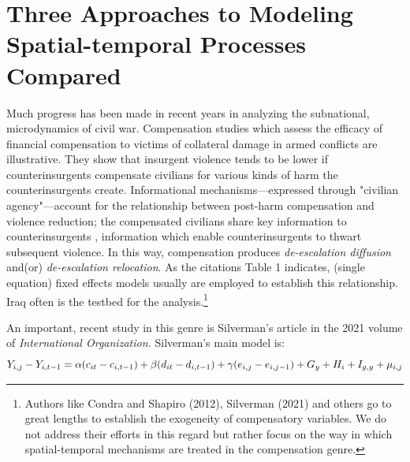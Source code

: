 \documentclass[12pt]{article}
\begin{document}
\section{Three Approaches to Modeling Spatial-temporal Processes Compared}
Much progress has been made in recent years in analyzing the subnational,
microdynamics of civil war. Compensation studies which assess the efficacy of financial compensation to victims of collateral damage in armed conflicts are illustrative.
They show that insurgent violence tends to be lower if counterinsurgents compensate
civilians for various kinds of harm the counterinsurgents create. Informational
mechanisms---expressed through "civilian agency"---account for the
relationship between post-harm compensation and violence
reduction; the compensated civilians share key information to counterinsurgents
, information which enable counterinsurgents
to thwart subsequent violence. In this way, compensation produces \emph{de-escalation
diffusion} and(or) \emph{de-escalation relocation}. As the citations Table 1 indicates,
(single equation) fixed effects models usually are
employed to establish this relationship. Iraq often is the testbed for the analysis.\footnote
{Authors like Condra and Shapiro (2012), Silverman (2021) and others go to great lengths to establish
the exogeneity of compensatory variables. We do not address their efforts in this
regard but rather focus on the way in which spatial-temporal mechanisms are treated
in the compensation genre.}

An important, recent study in this genre is Silverman's article in the 2021 volume
of \textit{International Organization.} Silverman's main model is:
\begin{equation}
Y_{i,j}-Y_{i,t-1} = \alpha (c_{it}-c_{i,t-1}) + \beta (d_{it}-d_{i,t-1}) + \gamma( e_{i,j}-e_{i,j-1})\\
 + G_y + H_i + I_{g,y} + \mu_{i,j}
 \label{equation:silverman}
\end{equation}
\end{document}
